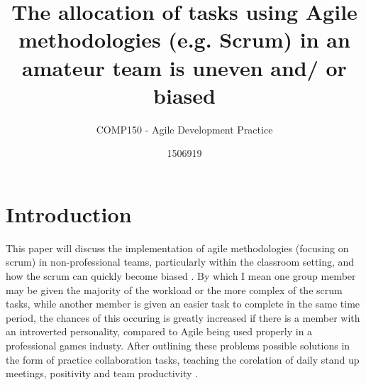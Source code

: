 \documentclass{scrartcl}
\title{The allocation of tasks using Agile methodologies (e.g. Scrum) in an amateur team is uneven and/ or biased}
\subtitle{COMP150 - Agile Development Practice}
\author{1506919}
\begin{document}
\maketitle


\section{Introduction}

This paper will discuss the implementation of agile methodologies \cite{beck2001manifesto} (focusing on scrum) in non-professional teams, particularly within the classroom setting, and how the scrum can quickly become biased \cite{kropp2014teaching}. By which I mean one group member may be given the majority of the workload or the more complex of the scrum tasks, while another member is given an easier task to complete in the same time period, the chances of this occuring is greatly increased if there is a member with an introverted personality, compared to Agile being used properly in a professional games industy. After outlining these problems possible solutions in the form of practice collaboration tasks, teaching the corelation of daily stand up meetings, positivity and team productivity \cite{kropp2016teaching}.





\end{document}
